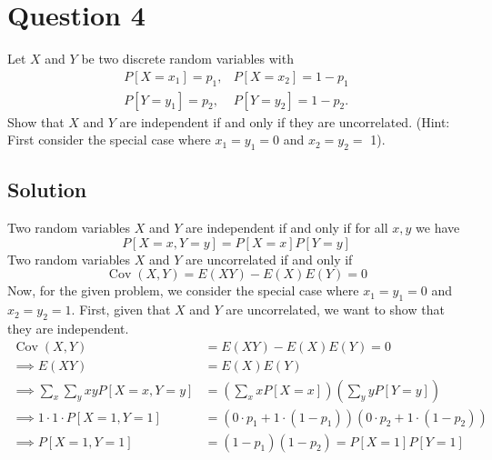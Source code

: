 \section*{Question 4}

Let \( X \) and \( Y \) be two discrete random variables with
\begin{align*}
    P\left[X=x_{1}\right]=p_{1}, & P\left[X=x_{2}\right]=1-p_{1}   \\
    P\left[Y=y_{1}\right]=p_{2}, & P\left[Y=y_{2}\right]=1-p_{2} .
\end{align*}
Show that \( X \) and \( Y \) are independent if and only if they are uncorrelated.
(Hint: First consider the special case where \( x_{1}=y_{1}=0 \) and \( x_{2}=y_{2}= \) 1).

\subsection*{Solution}

Two random variables \( X \) and \( Y \) are independent if and only if for all \( x, y \) we have
\begin{equation*}
    P[X=x, Y=y]
    =
    P[X=x] P[Y=y]
\end{equation*}
Two random variables \( X \) and \( Y \) are uncorrelated if and only if
\begin{equation*}
    \operatorname{Cov}(X, Y)
    =
    E(XY) - E(X)E(Y)
    =
    0
\end{equation*}
Now, for the given problem, we consider the special case where \( x_{1}=y_{1}=0 \) and \( x_{2}=y_{2}=1 \).
First, given that \( X \) and \( Y \) are uncorrelated, we want to show that they are independent.
\begin{align*}
    \operatorname{Cov}(X, Y)
     & =
    E(XY) - E(X)E(Y)
    =
    0
    \\
    \implies
    E(XY)
     & =
    E(X)E(Y)
    \\
    \implies
    \sum_{x} \sum_{y} x y P[X=x, Y=y]
     & =
    \left( \sum_{x} x P[X=x] \right) \left( \sum_{y} y P[Y=y] \right)
    \\
    \implies
    1 \cdot 1 \cdot P[X=1, Y=1]
     & =
    (0 \cdot p_{1} + 1 \cdot (1-p_{1}))
    (0 \cdot p_{2} + 1 \cdot (1-p_{2}))
    \\
    \implies
    P[X=1, Y=1]
     & =
    (1-p_{1})(1-p_{2})
    =
    P[X=1] P[Y=1]
\end{align*}
